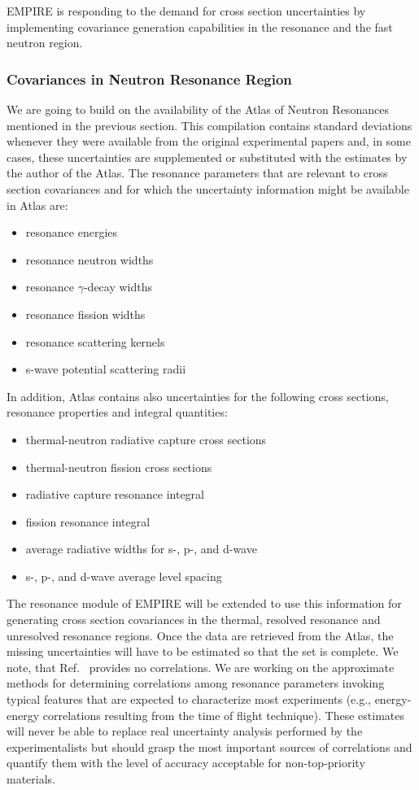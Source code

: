 \documentclass[twocolumn,amsmath,amssymb,10pt,groupedaddress,letter]{revtex4}
\begin{document}
EMPIRE is responding to the demand for cross section uncertainties by implementing covariance generation capabilities in the resonance and the fast neutron region.

\subsubsection{Covariances in Neutron Resonance Region}
We are going to build on the availability of the Atlas of Neutron Resonances~\cite{Mughabghab:06} mentioned in the previous section. This compilation contains standard deviations whenever they were available from the original experimental papers and,  in some cases, these uncertainties are supplemented or substituted with the estimates by the author of the Atlas. The resonance parameters that are relevant to cross section covariances and for which the uncertainty information might be available in Atlas are:
\begin{itemize}
\item resonance energies
\item resonance neutron widths
\item resonance $\gamma$-decay widths
\item resonance fission widths
\item resonance scattering kernels
\item s-wave potential scattering radii
\end{itemize}
In addition, Atlas contains also uncertainties for the following cross sections, resonance properties and integral quantities:
\begin{itemize}
\item thermal-neutron radiative capture cross sections
\item thermal-neutron fission cross sections
\item radiative capture resonance integral
\item fission resonance integral
\item average radiative widths for s-, p-, and d-wave
\item  s-, p-, and d-wave average level spacing
\end{itemize}

The resonance module of EMPIRE will be extended to use this information for generating cross section covariances in the thermal, resolved resonance and unresolved resonance regions. Once the data are retrieved from the Atlas, the missing uncertainties will have to be estimated so that the set is complete. We note, that Ref.~\cite{Mughabghab:06} provides no correlations. We are working on the approximate methods for determining correlations among resonance parameters invoking typical features that are expected to characterize most experiments (e.g., energy-energy correlations resulting from the time of flight technique). These estimates will never be able to replace real uncertainty analysis performed by the experimentalists but should grasp the most important sources of correlations and quantify them with the level of accuracy acceptable for non-top-priority materials.
\end{document}
